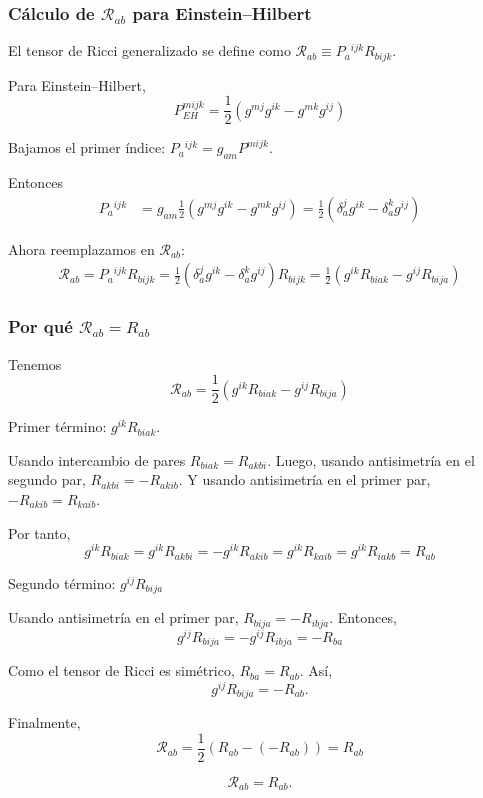 \documentclass{beamer}
\newcommand{\CompactDisplaySpacing}{%
  \setlength{\abovedisplayskip}{2pt plus 1pt minus 1pt}%
  \setlength{\belowdisplayskip}{2pt plus 1pt minus 1pt}%
  \setlength{\abovedisplayshortskip}{0pt plus 1pt}%
  \setlength{\belowdisplayshortskip}{1pt plus 1pt}%
}
\begin{document}
\begin{frame}[label=nav-frame-019]
\frametitle{Cálculo de \(\mathcal R_{ab}\) para Einstein--Hilbert}

El tensor de Ricci generalizado se define como $\mathcal R_{ab}\equiv P_a{}^{ijk}R_{bijk}$. \newline

Para Einstein--Hilbert,
\[
P^{mijk}_{EH}
=
\frac12
\left(g^{mj}g^{ik}-g^{mk}g^{ij}\right)
\]

Bajamos el primer índice: $P_a{}^{ijk} = g_{am}P^{mijk}$. \newline

Entonces
\[
\begin{aligned}
P_a{}^{ijk}&=g_{am}
\frac12
\left(g^{mj}g^{ik}-g^{mk}g^{ij}\right)
=
\frac12
\left(\delta_a^j g^{ik}-\delta_a^k g^{ij}\right)
\end{aligned}
\]

Ahora reemplazamos en \(\mathcal R_{ab}\):
\[
\begin{aligned}
\mathcal R_{ab}=P_a{}^{ijk}R_{bijk}=
\frac12
\left(\delta_a^j g^{ik}-\delta_a^k g^{ij}\right)
R_{bijk}=
\frac12
\left(g^{ik}R_{biak}-g^{ij}R_{bija}\right)
\end{aligned}
\]

\end{frame}

\begin{frame}[label=nav-frame-020]
\frametitle{Por qué \(\mathcal R_{ab}=R_{ab}\)}
\scriptsize
\linespread{.96}\selectfont\CompactDisplaySpacing

Tenemos
\[
\mathcal R_{ab}
=\frac12
\left(g^{ik}R_{biak}-g^{ij}R_{bija}\right)
\]

Primer término: $g^{ik}R_{biak}$. \newline

Usando intercambio de pares $R_{biak}=R_{akbi}$. Luego, usando antisimetría en el segundo par, $R_{akbi}=-R_{akib}$. Y usando antisimetría en el primer par, $-R_{akib}=R_{kaib}$.

Por tanto,
\[
g^{ik}R_{biak}
=g^{ik}R_{akbi} = -g^{ik}R_{akib}
=g^{ik}R_{kaib} = g^{ik}R_{iakb}
=R_{ab}
\]


Segundo término: $g^{ij}R_{bija}$ \newline

Usando antisimetría en el primer par, $R_{bija}=-R_{ibja}$. Entonces,
\[
g^{ij}R_{bija}
=
-g^{ij}R_{ibja}
=
-R_{ba}
\]

Como el tensor de Ricci es simétrico, $R_{ba}=R_{ab}$. Así,
\[
g^{ij}R_{bija}=-R_{ab}.
\]


Finalmente,
\[
\mathcal R_{ab}
=\frac12
\left(R_{ab}-(-R_{ab})\right)
=R_{ab}
\]

\[
\boxed{\mathcal R_{ab}=R_{ab}.}
\]

\end{frame}
\end{document}
